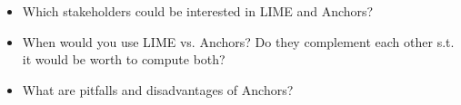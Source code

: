 \begin{itemize}
\item Which stakeholders could be interested in LIME and Anchors?
\item When would you use LIME vs. Anchors? Do they complement each other s.t. it would be worth to compute both?
\item What are pitfalls and disadvantages of Anchors?
\end{itemize}
